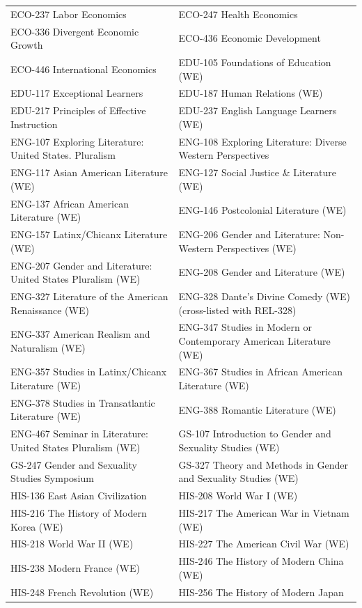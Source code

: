 \documentclass[
  letterpaper,
]{scrbook}
\begin{document}
{\begin{longtable}[]{@{}
  >{\raggedright\arraybackslash}p{}
  >{\raggedright\arraybackslash}p{}@{}}
ECO-237 Labor Economics & ECO-247 Health Economics \\
ECO-336 Divergent Economic Growth & ECO-436 Economic Development \\
ECO-446 International Economics & EDU-105 Foundations of Education
(WE) \\
EDU-117 Exceptional Learners & EDU-187 Human Relations (WE) \\
EDU-217 Principles of Effective Instruction & EDU-237 English Language
Learners (WE) \\
ENG-107 Exploring Literature: United States. Pluralism & ENG-108
Exploring Literature: Diverse Western Perspectives \\
ENG-117 Asian American Literature (WE) & ENG-127 Social Justice \&
Literature (WE) \\
ENG-137 African American Literature (WE) & ENG-146 Postcolonial
Literature (WE) \\
ENG-157 Latinx/Chicanx Literature (WE) & ENG-206 Gender and Literature:
Non-Western Perspectives (WE) \\
ENG-207 Gender and Literature: United States Pluralism (WE) & ENG-208
Gender and Literature (WE) \\
ENG-327 Literature of the American Renaissance (WE) & ENG-328 Dante's
Divine Comedy (WE) (cross-listed with REL-328) \\
ENG-337 American Realism and Naturalism (WE) & ENG-347 Studies in Modern
or Contemporary American Literature (WE) \\
ENG-357 Studies in Latinx/Chicanx Literature (WE) & ENG-367 Studies in
African American Literature (WE) \\
ENG-378 Studies in Transatlantic Literature (WE) & ENG-388 Romantic
Literature (WE) \\
ENG-467 Seminar in Literature: United States Pluralism (WE) & GS-107
Introduction to Gender and Sexuality Studies (WE) \\
GS-247 Gender and Sexuality Studies Symposium & GS-327 Theory and
Methods in Gender and Sexuality Studies (WE) \\
HIS-136 East Asian Civilization & HIS-208 World War I (WE) \\
HIS-216 The History of Modern Korea (WE) & HIS-217 The American War in
Vietnam (WE) \\
HIS-218 World War II (WE) & HIS-227 The American Civil War (WE) \\
HIS-238 Modern France (WE) & HIS-246 The History of Modern China (WE) \\
HIS-248 French Revolution (WE) & HIS-256 The History of Modern Japan

\end{longtable}}
\end{document}
